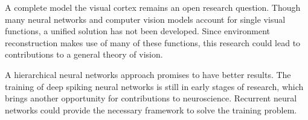 A complete model the visual cortex remains an open research question. Though many neural networks and computer vision models account for single visual functions, a unified solution has not been developed. Since environment reconstruction makes use of many of these functions, this research could lead to contributions to a general theory of vision. 

A hierarchical neural networks approach promises to have better results. The training of deep spiking neural networks is still in early stages of research, which brings another opportunity for contributions to neuroscience. Recurrent neural networks could provide the necessary framework to solve the training problem.